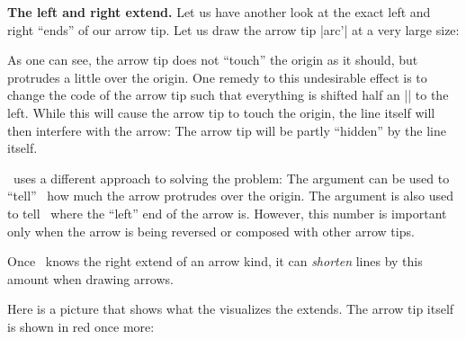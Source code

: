 \begin{command}{\pgfarrowsdeclare{}}
  \medskip
  \textbf{The left and right extend.}
  Let us have another look at the exact left and right ``ends'' of our
  arrow tip. Let us draw the arrow tip |arc'| at a very large size:

\begin{codeexample}[]
\end{codeexample}

  As one can see, the arrow tip does not ``touch'' the origin as it
  should, but protrudes a little over the origin. One remedy to this
  undesirable effect is to change the code of the arrow tip such that
  everything is shifted half an |\arrowsize| to the left. While this
  will cause the arrow tip to touch the origin, the line itself will
  then interfere with the arrow: The arrow tip will be partly
  ``hidden'' by the line itself.

  \pgfname\ uses a different approach to solving the problem: The
   argument can be used to ``tell'' \pgfname\ how
  much the arrow protrudes over the origin. The argument is also used
  to tell \pgfname\ where the ``left'' end of the arrow is. However,
  this number is important only when the arrow is being reversed or
  composed with other arrow tips.

  Once \pgfname\ knows the right extend of an arrow kind, it can
  \emph{shorten} lines by this amount when drawing arrows.

  Here is a picture that shows what the visualizes the extends. The
  arrow tip itself is shown in red once more:

  \medskip
\end{command}
